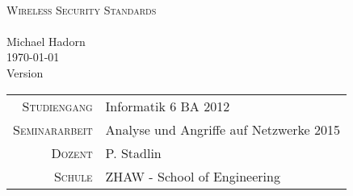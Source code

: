 




\begin{titlepage}
	\mbox{}\vspace{5\baselineskip}\\
	\rmfamily\huge
	\centering
	\textsc{Wireless Security Standards} \\
	\mbox{}\vspace{1\baselineskip}\\
	Michael Hadorn\\
	\vspace{2\baselineskip}
	\rmfamily\Large
	\today\\
	Version \mbox{} \\
	\normalsize
	
	\vfill

	\begin{center}
		\begin{tabular}[h]{ r l }
			\textsc{\small{Studiengang}} & Informatik 6 BA 2012\\
			\textsc{\small{Seminararbeit}} & Analyse und Angriffe auf Netzwerke 2015\\
			\textsc{\small{Dozent}} & P. Stadlin\\
			\textsc{\small{Schule}} & ZHAW - School of Engineering\\
		\end{tabular}
	\end{center}

\end{titlepage}

 

